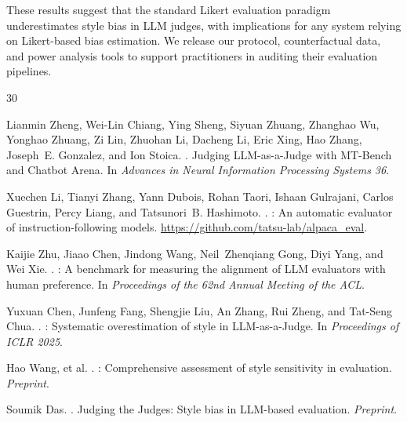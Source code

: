 \documentclass[11pt,a4paper]{article}
\begin{document}
These results suggest that the standard Likert evaluation paradigm underestimates style bias in LLM judges, with implications for any system relying on Likert-based bias estimation.
We release our protocol, counterfactual data, and power analysis tools to support practitioners in auditing their evaluation pipelines.


\begin{thebibliography}{30}

Lianmin Zheng, Wei-Lin Chiang, Ying Sheng, Siyuan Zhuang, Zhanghao Wu, Yonghao Zhuang, Zi Lin, Zhuohan Li, Dacheng Li, Eric Xing, Hao Zhang, Joseph~E. Gonzalez, and Ion Stoica.
.
\newblock Judging {LLM}-as-a-Judge with {MT-Bench} and {Chatbot Arena}.
\newblock In \emph{Advances in Neural Information Processing Systems 36}.

Xuechen Li, Tianyi Zhang, Yann Dubois, Rohan Taori, Ishaan Gulrajani, Carlos Guestrin, Percy Liang, and Tatsunori~B. Hashimoto.
.
: An automatic evaluator of instruction-following models.
\newblock \url{https://github.com/tatsu-lab/alpaca_eval}.

Kaijie Zhu, Jiaao Chen, Jindong Wang, Neil~Zhenqiang Gong, Diyi Yang, and Wei Xie.
.
: A benchmark for measuring the alignment of {LLM} evaluators with human preference.
\newblock In \emph{Proceedings of the 62nd Annual Meeting of the ACL}.

Yuxuan Chen, Junfeng Fang, Shengjie Liu, An Zhang, Rui Zheng, and Tat-Seng Chua.
.
: Systematic overestimation of style in {LLM-as-a-Judge}.
\newblock In \emph{Proceedings of ICLR 2025}.

Hao Wang, et al.
.
: Comprehensive assessment of style sensitivity in evaluation.
\newblock \emph{Preprint}.

Soumik Das.
.
\newblock Judging the Judges: Style bias in {LLM}-based evaluation.
\newblock \emph{Preprint}.


\end{thebibliography}
\end{document}
